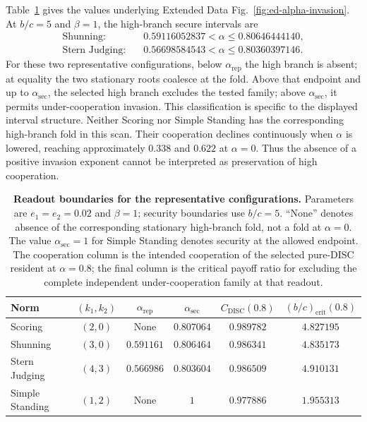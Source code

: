 \documentclass[fleqn,10pt]{wlscirep}
\begin{document}
Table~\ref{tab:si-readout-boundaries} gives the values underlying Extended Data Fig.~\ref{fig:ed-alpha-invasion}. At $b/c=5$ and $\beta=1$, the high-branch secure intervals are
\begin{equation}
\begin{aligned}
\text{Shunning:}\quad&0.59116052837<\alpha\leq0.80646444140,\\
\text{Stern Judging:}\quad&0.56698584543<\alpha\leq0.80360397146.
\end{aligned}
\label{eq:si-readout-feasible-intervals}
\end{equation}
For these two representative configurations, below $\alpha_{\mathrm{rep}}$ the high branch is absent; at equality the two stationary roots coalesce at the fold. Above that endpoint and up to $\alpha_{\mathrm{sec}}$, the selected high branch excludes the tested family; above $\alpha_{\mathrm{sec}}$, it permits under-cooperation invasion. This classification is specific to the displayed interval structure. Neither Scoring nor Simple Standing has the corresponding high-branch fold in this scan. Their cooperation declines continuously when $\alpha$ is lowered, reaching approximately $0.338$ and $0.622$ at $\alpha=0$. Thus the absence of a positive invasion exponent cannot be interpreted as preservation of high cooperation.

\begin{table}[htbp]
\centering
\caption{\textbf{Readout boundaries for the representative configurations.}
Parameters are $e_1=e_2=0.02$ and $\beta=1$; security boundaries use $b/c=5$. ``None'' denotes absence of the corresponding stationary high-branch fold, not a fold at $\alpha=0$. The value $\alpha_{\mathrm{sec}}=1$ for Simple Standing denotes security at the allowed endpoint. The cooperation column is the intended cooperation of the selected pure-DISC resident at $\alpha=0.8$; the final column is the critical payoff ratio for excluding the complete independent under-cooperation family at that readout.}
\label{tab:si-readout-boundaries}
\begin{tabular}{lccccc}
\toprule
Norm & $(k_1,k_2)$ & $\alpha_{\mathrm{rep}}$ & $\alpha_{\mathrm{sec}}$ & $C_{\mathrm{DISC}}(0.8)$ & $(b/c)_{\mathrm{crit}}(0.8)$\\
\midrule
Scoring & $(2,0)$ & None & $0.807064$ & $0.989782$ & $4.827195$\\
Shunning & $(3,0)$ & $0.591161$ & $0.806464$ & $0.986341$ & $4.835173$\\
Stern Judging & $(4,3)$ & $0.566986$ & $0.803604$ & $0.986509$ & $4.910131$\\
Simple Standing & $(1,2)$ & None & $1$ & $0.977886$ & $1.955313$\\
\bottomrule
\end{tabular}
\end{table}
\end{document}
